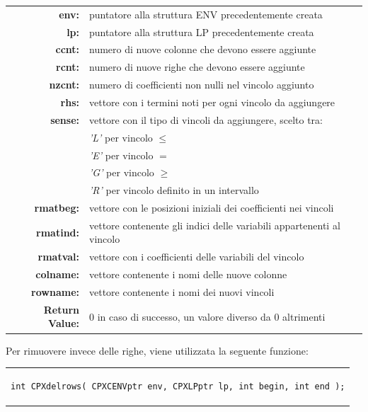 \begin{table}[h]
\centering
\begin{tabular}{rl}
\textbf{env:} & {puntatore alla struttura ENV precedentemente creata}\\
\textbf{lp:} & {puntatore alla struttura LP precedentemente creata}\\
\textbf{ccnt:} & {numero di nuove colonne che devono essere aggiunte}\\
\textbf{rcnt:} & {numero di nuove righe che devono essere aggiunte}\\
\textbf{nzcnt:} & {numero di coefficienti non nulli nel vincolo aggiunto}\\
\textbf{rhs:} & {vettore con i termini noti per ogni vincolo da aggiungere}\\
\textbf{sense:} & {vettore con il tipo di vincoli da aggiungere, scelto tra:}\\
&{\textit{'L'} per vincolo $\leq$}\\
&{\textit{'E'} per vincolo $=$}\\
&{\textit{'G'} per vincolo $\geq$}\\
&{\textit{'R'} per vincolo definito in un intervallo}\\
\textbf{rmatbeg:} & {vettore con le posizioni iniziali dei coefficienti nei vincoli}\\
\textbf{rmatind:} & {vettore contenente gli indici delle variabili appartenenti al vincolo}\\
\textbf{rmatval:} & {vettore con i coefficienti delle variabili del vincolo}\\
\textbf{colname:} & {vettore contenente i nomi delle nuove colonne}\\
\textbf{rowname:} & {vettore contenente i nomi dei nuovi vincoli}\\
\textbf{Return Value:} & {0 in caso di successo, un valore diverso da 0 altrimenti}\\
\end{tabular}
\end{table}
Per rimuovere invece delle righe, viene utilizzata la seguente funzione:
\begin{center}
\begin{tabular}{c}
\begin{lstlisting}[linewidth=330pt, basicstyle=\footnotesize\sffamily,]     
int CPXdelrows( CPXCENVptr env, CPXLPptr lp, int begin, int end );
\end{lstlisting}
\end{tabular}
\end{center}
